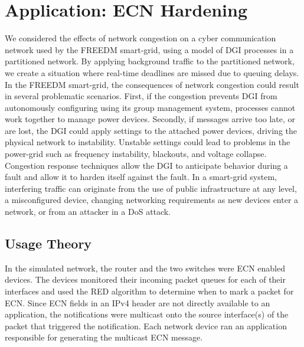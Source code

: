 
\chapter{Application: ECN Hardening}

We considered the effects of network congestion on a cyber communication network used by the \ac{FREEDM} smart-grid, using a model of \ac{DGI} processes in a partitioned network.
By applying background traffic to the partitioned network, we create a situation where real-time deadlines are missed due to queuing delays.
In the \ac{FREEDM} smart-grid, the consequences of network congestion could result in several problematic scenarios.
First, if the congestion prevents \ac{DGI} from autonomously configuring using its group management system, processes cannot work together to manage power devices.
Secondly, if messages arrive too late, or are lost, the \ac{DGI} could apply settings to the attached power devices, driving the physical network to instability.
Unstable settings could lead to problems in the power-grid such as frequency instability, blackouts, and voltage collapse.
Congestion response techniques allow the DGI to anticipate behavior during a fault and allow it to harden itself against the fault.
In a smart-grid system, interfering traffic can originate from the use of public infrastructure at any level\cite{smartgrid-comm-germany}\cite{smartgrid-comm-lastmile}, a misconfigured device, changing networking requirements as new devices enter a network, or from an attacker in a \ac{DoS} attack.

\section{Usage Theory}
In the simulated network, the router and the two switches were ECN enabled devices.
The devices monitored their incoming packet queues for each of their interfaces and used the \ac{RED} algorithm to determine when to mark a packet for \ac{ECN}.
Since \ac{ECN} fields in an IPv4 header are not directly available to an application, the notifications were multicast onto the source interface(s) of the packet that triggered the notification.
Each network device ran an application responsible for generating the multicast ECN message.

